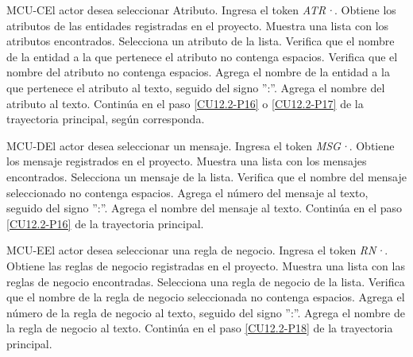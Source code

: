 	\begin{UCtrayectoriaA}{MCU-C}{El actor desea seleccionar Atributo.}
		\UCpaso[\UCactor] Ingresa el token {\em ATR·}. 
		\UCpaso[\UCsist] Obtiene los atributos de las entidades registradas en el proyecto.
		\UCpaso[\UCsist] Muestra una lista con los atributos encontrados.
		\UCpaso[\UCactor] Selecciona un atributo de la lista.
		\UCpaso[\UCsist] Verifica que el nombre de la entidad a la que pertenece el atributo no contenga espacios. 
		\UCpaso[\UCsist] Verifica que el nombre del atributo no contenga espacios. 
		\UCpaso[\UCsist] Agrega el nombre de la entidad a la que pertenece el atributo al texto, seguido del signo '':''.
		\UCpaso[\UCsist] Agrega el nombre del atributo al texto.
		\UCpaso Continúa en el paso \ref{CU12.2-P16} o \ref{CU12.2-P17} de la trayectoria principal, según corresponda.
	\end{UCtrayectoriaA}

	\begin{UCtrayectoriaA}{MCU-D}{El actor desea seleccionar un mensaje.}
		\UCpaso[\UCactor] Ingresa el token {\em MSG·}. 
		\UCpaso[\UCsist] Obtiene los mensaje registrados en el proyecto.
		\UCpaso[\UCsist] Muestra una lista con los mensajes encontrados.
		\UCpaso[\UCactor] Selecciona un mensaje de la lista.
		\UCpaso[\UCsist] Verifica que el nombre del mensaje seleccionado no contenga espacios. 
		\UCpaso[\UCsist] Agrega el número del mensaje al texto, seguido del signo '':''.
		\UCpaso[\UCsist] Agrega el nombre del mensaje al texto.
		\UCpaso Continúa en el paso \ref{CU12.2-P16} de la trayectoria principal.
	\end{UCtrayectoriaA}

	\begin{UCtrayectoriaA}{MCU-E}{El actor desea seleccionar una regla de negocio.}
		\UCpaso[\UCactor] Ingresa el token {\em RN·}. 
		\UCpaso[\UCsist] Obtiene las reglas de negocio registradas en el proyecto.
		\UCpaso[\UCsist] Muestra una lista con las reglas de negocio encontradas.
		\UCpaso[\UCactor] Selecciona una regla de negocio de la lista.
		\UCpaso[\UCsist] Verifica que el nombre de la regla de negocio seleccionada no contenga espacios. 
		\UCpaso[\UCsist] Agrega el número de la regla de negocio al texto, seguido del signo '':''.
		\UCpaso[\UCsist] Agrega el nombre de la regla de negocio al texto.
		\UCpaso Continúa en el paso \ref{CU12.2-P18} de la trayectoria principal.
	\end{UCtrayectoriaA}

